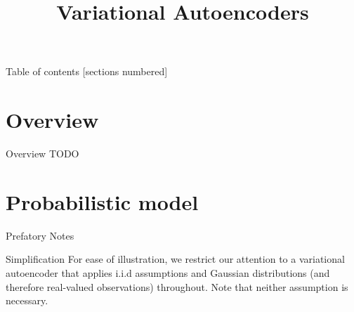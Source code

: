 \documentclass[10pt]{beamer}
\title{Variational Autoencoders}
\begin{document}
\maketitle

\begin{frame}{Table of contents}
  [sections numbered]
  \tableofcontents[hideallsubsections]
\end{frame}

\section{Overview}

\begin{frame}{Overview}
TODO
\end{frame}



\section{Probabilistic model}

\begin{frame}{Prefatory Notes}
\begin{sblock}{Simplification}
For ease of illustration, we restrict our attention to a variational autoencoder that applies i.i.d assumptions and Gaussian distributions (and therefore real-valued observations) throughout.    Note that neither assumption is necessary. 
\end{sblock}
\end{frame}
\end{document}
